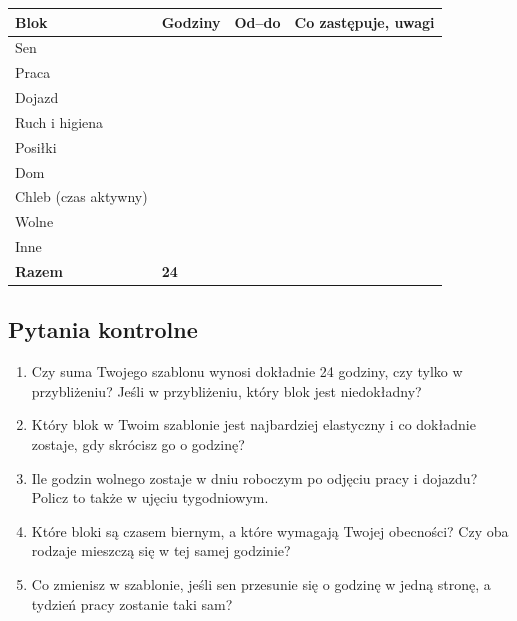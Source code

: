 \begin{center}\small
\renewcommand{\arraystretch}{1.3}
\begin{tabular}{|p{4.6cm}|p{2.2cm}|p{2.6cm}|p{4.6cm}|}
\hline
\textsf{\textbf{Blok}} & \textsf{\textbf{Godziny}} & \textsf{\textbf{Od--do}} & \textsf{\textbf{Co zastępuje, uwagi}}\\
\hline
Sen & & & \\
\hline
Praca & & & \\
\hline
Dojazd & & & \\
\hline
Ruch i higiena & & & \\
\hline
Posiłki & & & \\
\hline
Dom & & & \\
\hline
Chleb (czas aktywny) & & & \\
\hline
Wolne & & & \\
\hline
Inne & & & \\
\hline
\textbf{Razem} & \textbf{24} & & \\
\hline
\end{tabular}
\end{center}

\subsection*{Pytania kontrolne}

\begin{enumerate}
\item Czy suma Twojego szablonu wynosi dokładnie 24 godziny, czy tylko w przybliżeniu? Jeśli w przybliżeniu, który blok jest niedokładny?
\item Który blok w Twoim szablonie jest najbardziej elastyczny i co dokładnie zostaje, gdy skrócisz go o godzinę?
\item Ile godzin wolnego zostaje w dniu roboczym po odjęciu pracy i dojazdu? Policz to także w ujęciu tygodniowym.
\item Które bloki są czasem biernym, a które wymagają Twojej obecności? Czy oba rodzaje mieszczą się w tej samej godzinie?
\item Co zmienisz w szablonie, jeśli sen przesunie się o godzinę w jedną stronę, a tydzień pracy zostanie taki sam?
\end{enumerate}
